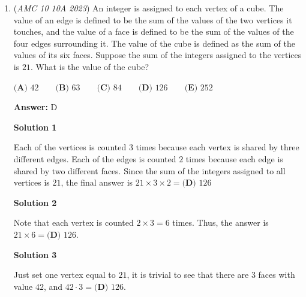 \begin{enumerate}
Multiplying it out, we get that $8^5 \cdot 5^{10} \cdot 15^5 = 243000000000000000$. Counting, we have the answer is $\text{\boxed{\textbf{(E) }18}}$~andliu766

 



\textbf{Solution 3 (Similar to Solution 1)}

All the exponents have a common factor of $5$ which we can factor out. This leaves us with $(8 \cdot 5^2 \cdot 15)^5 = (3000)^5 = (3 \cdot 1000)^5$. We can then distribute the power leaving us with $3^5 \cdot 10^{3 \cdot 5} = 243 \cdot 10^{15}$. This would be $243$ followed by $15$ zeros resulting in our answer being $15+3=\text{\boxed{\textbf{(E)}18}}$~leon\_0iler

 


	\item (\textit{AMC 10 10A 2023}) An integer is assigned to each vertex of a cube. The value of an edge is defined to be the sum of the values of the two vertices it touches, and the value of a face is defined to be the sum of the values of the four edges surrounding it. The value of the cube is defined as the sum of the values of its six faces. Suppose the sum of the integers assigned to the vertices is $21$. What is the value of the cube? 


 $\textbf{(A) } 42 \qquad \textbf{(B) } 63 \qquad \textbf{(C) } 84 \qquad \textbf{(D) } 126 \qquad \textbf{(E) } 252$

 \textbf{Answer: }D



\textbf{Solution 1}

Each of the vertices is counted $3$ times because each vertex is shared by three different edges. Each of the edges is counted $2$ times because each edge is shared by two different faces. Since the sum of the integers assigned to all vertices is $21$, the final answer is $21\times3\times2=\boxed{\textbf{(D) } 126}$




\textbf{Solution 2}

Note that each vertex is counted $2\times 3=6$ times. Thus, the answer is $21\times6=\boxed{\textbf{(D) } 126}$.

 



\textbf{Solution 3}

Just set one vertex equal to $21$, it is trivial to see that there are $3$ faces with value $42$, and $42 \cdot 3=\boxed{\textbf{(D) } 126}$.


\end{enumerate}
